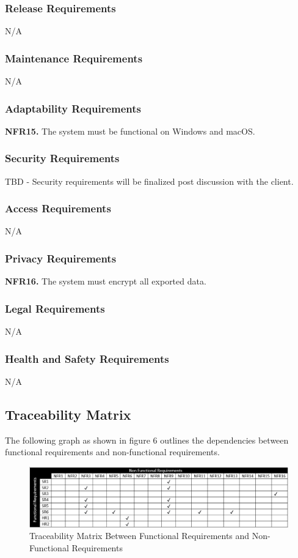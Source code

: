 \documentclass[12pt, titlepage]{article}
\begin{document}
\subsubsection{Release Requirements}
N/A
\subsubsection{Maintenance Requirements}
N/A

\subsubsection{Adaptability Requirements}
\textbf{NFR15.} The system must be functional on Windows and macOS.

\subsubsection{Security Requirements}
TBD - Security requirements will be finalized post discussion with the client.

\subsubsection{Access Requirements}
N/A

\subsubsection{Privacy Requirements}
\textbf{NFR16.} The system must encrypt all exported data.


\subsubsection{Legal Requirements}
N/A

\subsubsection{Health and Safety Requirements}
N/A

\subsection {Traceability Matrix}
The following graph as shown in figure 6 outlines the dependencies between functional requirements and non-functional requirements.

\begin{figure}[h]
    \centering
    \includegraphics[width=15cm]{images/TraceabilityMatrix.png}
    \caption[]{Traceability Matrix Between Functional Requirements and Non-Functional Requirements}
    \label{fig:figure6}
\end{figure}
\end{document}
